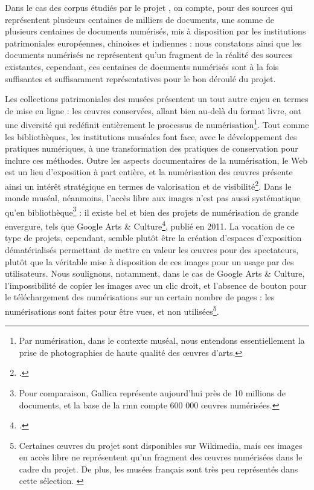 	Dans le cas des corpus étudiés par le projet \eida, on compte, pour des sources qui représentent plusieurs centaines de milliers de documents, une somme de plusieurs centaines de documents numérisés, mis à disposition par les institutions patrimoniales européennes, chinoises et indiennes : nous constatons ainsi que les documents numérisés ne représentent qu'un fragment de la réalité des sources existantes, cependant, ces centaines de documents numérisés sont à la fois suffisantes et suffisamment représentatives pour le bon déroulé du projet.
	
	Les collections patrimoniales des musées présentent un tout autre enjeu en termes de mise en ligne : les œuvres conservées, allant bien au-delà du format livre, ont une diversité qui redéfinit entièrement le processus de numérisation\footnote{Par numérisation, dans le contexte muséal, nous entendons essentiellement la prise de photographies de haute qualité des œuvres d'arts.}. Tout comme les bibliothèques, les institutions muséales font face, avec le développement des pratiques numériques, à une transformation des pratiques de conservation pour inclure ces méthodes. Outre les aspects documentaires de la numérisation, le Web est un lieu d'exposition à part entière, et la numérisation des œuvres présente ainsi un intérêt stratégique en termes de valorisation et de visibilité\footcite{baujardNumerisationPatrimoineCulturel2017}. Dans le monde muséal, néanmoins, l'accès libre aux images n'est pas aussi systématique qu'en bibliothèque\footnote{Pour comparaison, Gallica représente aujourd'hui près de 10 millions de documents, et la base de la \acrfull{rmn} compte 600 000 œuvres numérisées.} : il existe bel et bien des projets de numérisation de grande envergure, tels que Google Arts \& Culture\footcite{GoogleArtsCulture}, publié en 2011. La vocation de ce type de projets, cependant, semble plutôt être la création d'espaces d'exposition dématérialisés permettant de mettre en valeur les œuvres pour des spectateurs, plutôt que la véritable mise à disposition de ces images pour un usage par des utilisateurs. Nous soulignons, notamment, dans le cas de Google Arts \& Culture, l'impossibilité de copier les images avec un clic droit, et l'absence de bouton pour le téléchargement des numérisations sur un certain nombre de pages : les numérisations sont faites pour être vues, et non utilisées\footnote{Certaines œuvres du projet sont disponibles sur Wikimedia, mais ces images en accès libre ne représentent qu'un fragment des œuvres numérisées dans le cadre du projet. De plus, les musées français sont très peu représentés dans cette sélection. \cite{CategoryGoogleArt}}. 
	
